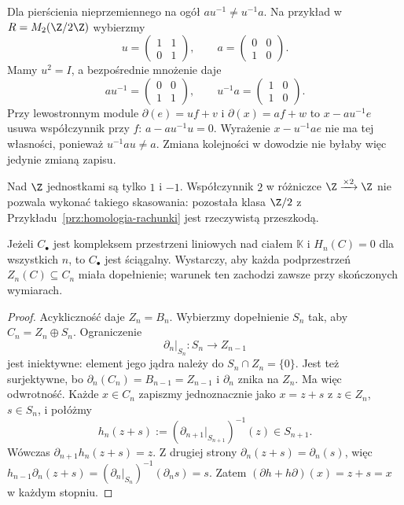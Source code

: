\begin{uwaga}
\label{uwaga:nieprzemienny-pivot-top}
Dla pierścienia nieprzemiennego na ogół
$a u^{-1}\ne u^{-1}a$. Na przykład w
$R=M_2(\Z/2\Z)$ wybierzmy
\[
 u=\begin{pmatrix}1&1\\0&1\end{pmatrix},
 \qquad
 a=\begin{pmatrix}0&0\\1&0\end{pmatrix}.
\]
Mamy $u^2=I$, a bezpośrednie mnożenie daje
\[
 au^{-1}=\begin{pmatrix}0&0\\1&1\end{pmatrix},
 \qquad
 u^{-1}a=\begin{pmatrix}1&0\\1&0\end{pmatrix}.
\]
Przy lewostronnym module
$\partial(e)=u f+v$ i $\partial(x)=a f+w$
to $x-a u^{-1}e$ usuwa współczynnik przy $f$:
$a-a u^{-1}u=0$. Wyrażenie $x-u^{-1}a e$
nie ma tej własności, ponieważ
$u^{-1}a u\ne a$. Zmiana kolejności w
dowodzie nie byłaby więc jedynie zmianą zapisu.
\end{uwaga}

Nad $\Z$ jednostkami są tylko $1$ i $-1$.
Współczynnik $2$ w różniczce
$\Z\xrightarrow{\times2}\Z$ nie pozwala
wykonać takiego skasowania: pozostała
klasa $\Z/2$ z
Przykładu~\ref{prz:homologia-rachunki}
jest rzeczywistą przeszkodą.

\begin{stwierdzenie}
\label{prop:acykliczny-sciagalny}
Jeżeli $C_\bullet$ jest kompleksem
przestrzeni liniowych nad ciałem
$\mathbb K$ i $H_n(C)=0$ dla wszystkich
$n$, to $C_\bullet$ jest ściągalny.
Wystarczy, aby każda podprzestrzeń
$Z_n(C)\subseteq C_n$ miała dopełnienie;
warunek ten zachodzi zawsze przy
skończonych wymiarach.
\end{stwierdzenie}
\begin{proof}
Acykliczność daje $Z_n=B_n$.
Wybierzmy dopełnienie $S_n$ tak, aby
$C_n=Z_n\oplus S_n$. Ograniczenie
\[
 \partial_n|_{S_n}:S_n\longrightarrow Z_{n-1}
\]
jest iniektywne: element jego jądra
należy do $S_n\cap Z_n=\{0\}$.
Jest też surjektywne, bo
$\partial_n(C_n)=B_{n-1}=Z_{n-1}$
i $\partial_n$ znika na $Z_n$.
Ma więc odwrotność.
Każde $x\in C_n$ zapiszmy
jednoznacznie jako $x=z+s$
z $z\in Z_n$, $s\in S_n$, i połóżmy
\[
 h_n(z+s)
 :=(\partial_{n+1}|_{S_{n+1}})^{-1}(z)
 \in S_{n+1}.
\]
Wówczas $\partial_{n+1}h_n(z+s)=z$.
Z drugiej strony $\partial_n(z+s)=\partial_n(s)$,
więc
$h_{n-1}\partial_n(z+s)
=(\partial_n|_{S_n})^{-1}(\partial_ns)=s$.
Zatem $(\partial h+h\partial)(x)=z+s=x$
w każdym stopniu.
\end{proof}

